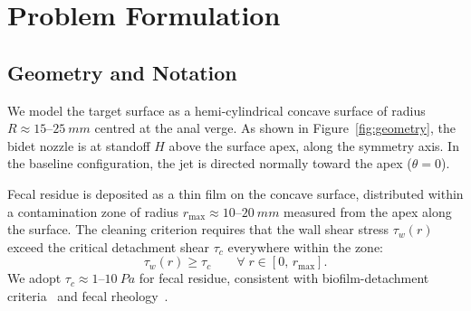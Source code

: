 \documentclass[aps,prfluids,reprint,amsmath,amssymb,floatfix]{revtex4-2}
\begin{document}
\section{Problem Formulation}
\label{sec:problem}

\subsection{Geometry and Notation}

We model the target surface as a hemi-cylindrical concave surface of
radius $R \approx 15$--$\SI{25}{mm}$ centred at the anal verge. As shown
in Figure~\ref{fig:geometry}, the bidet nozzle is at standoff $H$ above
the surface apex, along the symmetry axis. In the baseline configuration,
the jet is directed normally toward the apex ($\theta = 0$).

Fecal residue is deposited as a thin film on the concave surface, distributed
within a contamination zone of radius $r_\mathrm{max} \approx 10$--$\SI{20}{mm}$
measured from the apex along the surface. The cleaning criterion requires
that the wall shear stress $\tau_w(r)$ exceed the critical detachment
shear $\tau_c$ everywhere within the zone:
\begin{equation}
  \tau_w(r) \geq \tau_c \qquad \forall\; r \in [0,\,r_\mathrm{max}].
  \label{eq:cleaning}
\end{equation}
We adopt $\tau_c \approx 1$--$\SI{10}{Pa}$ for fecal residue, consistent
with biofilm-detachment criteria~\citep{Ehedg2003} and fecal
rheology~\citep{Woolley2014}.
\end{document}
